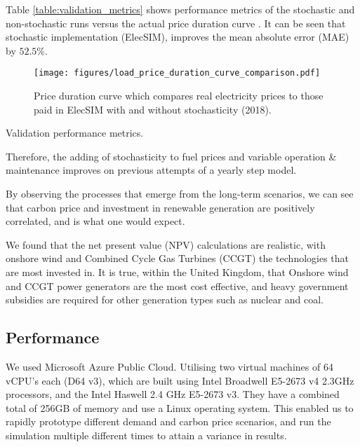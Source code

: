 Table \ref{table:validation_metrics} shows performance metrics of the stochastic and non-stochastic runs versus the actual price duration curve . It can be seen that stochastic implementation (ElecSIM), improves the mean absolute error (MAE) by $52.5\%$.

\begin{figure}
	\begin{center}
		\texttt{[image: figures/load\_price\_duration\_curve\_comparison.pdf]}
		\caption{Price duration curve which compares real electricity prices to those paid in ElecSIM with and without stochasticity (2018).}
		\label{fig:price_duration_curve}
	\end{center}
\end{figure}


\begin{table}
	\centering
	\caption{Validation performance metrics.}
	\label{table:validation_metrics}
\end{table}
\addtolength{\textfloatsep}{-0.05in}

Therefore, the adding of stochasticity to fuel prices and variable operation \& maintenance improves on previous attempts of a yearly step model.

By observing the processes that emerge from the long-term scenarios, we can see that carbon price and investment in renewable generation are positively correlated, and is what one would expect.

We found that the net present value (NPV) calculations are realistic, with onshore wind and Combined Cycle Gas Turbines (CCGT) the technologies that are most invested in. It is true, within the United Kingdom, that Onshore wind and CCGT power generators are the most cost effective, and heavy government subsidies are required for other generation types such as nuclear and coal. 



\subsection{Performance}

 We used Microsoft Azure Public Cloud. Utilising two virtual machines of 64 vCPU's each (D64 v3), which are built using Intel Broadwell E5-2673 v4 2.3GHz processors, and the Intel Haswell 2.4 GHz E5-2673 v3. They have a combined total of 256GB of memory and use a Linux operating system. {\color{red}This enabled us to rapidly prototype different demand and carbon price scenarios, and run the simulation multiple different times to attain a variance in results.}


